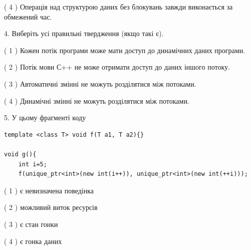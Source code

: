 \documentclass[12pt, ukrainian]{article}
\begin{document}
\begin {large}
{( 4 ) Операція над структурою даних без блокувань завжди виконається за обмежений час.%


4. Виберіть усі правильні твердження (якщо такі є).\par
\vspace{2mm}

( 1 ) Кожен потік програми може мати доступ до динамічних даних програми.%

( 2 ) Потік мови С++ не може отримати доступ до даних іншого потоку.%

( 3 ) Автоматичні змінні не можуть розділятися між потоками.%

( 4 ) Динамічні змінні не можуть розділятися між потоками.%


5. У цьому фрагменті коду
\begin{verbatim}
template <class T> void f(T a1, T a2){}

void g(){
    int i=5;
    f(unique_ptr<int>(new int(i++)), unique_ptr<int>(new int(++i)));
\end{verbatim}

( 1 ) є невизначена поведінка%

( 2 ) можливий виток ресурсів%

( 3 ) є стан гонки%

( 4 ) є гонка даних%
}
\end {large}
\end{document}
